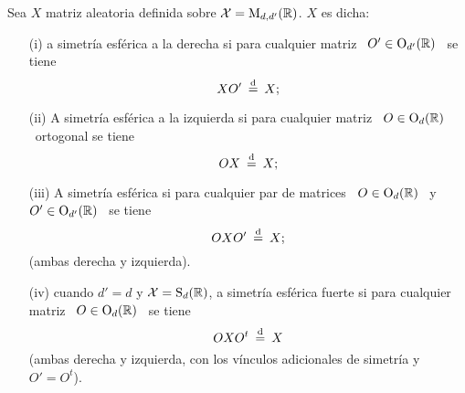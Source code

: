 \begin{definicion}
  Sea  $X$ matriz  aleatoria definida  sobre  $\mathcal{X} =  \mathrm{M}_{d,d'}(\mathbb{R})$.  $X$  es
  dicha:
  \begin{enumerate}%
  \item[(i)] a simetr\'ia esf\'erica a la  derecha si para cualquier matriz \ $O'
    \in \mathrm{O}_{d'}(\mathbb{R})$ \ se tiene
    \[
    X O' \: \stackrel{\mathrm{d}}{=} \: X;
    \]
  \item[(ii)] A simetr\'ia esf\'erica a  la izquierda si para cualquier matriz \
    $O \in \mathrm{O}_d(\mathbb{R})$ \ ortogonal se tiene
    \[
    O X \: \stackrel{\mathrm{d}}{=} \: X;
    \]
  \item[(iii)] A  simetr\'ia esf\'erica si para  cualquier par de  matrices \ $O
    \in \mathrm{O}_d(\mathbb{R})$ \ y \ $O' \in \mathrm{O}_{d'}(\mathbb{R})$ \ se tiene
    \[
    O X O' \: \stackrel{\mathrm{d}}{=} \: X;
    \]
    (ambas derecha y izquierda).
  \item[(iv)]  cuando $d'  = d$  y $\mathcal{X}  = \mathrm{S}_d(\mathbb{R})$,  a  simetr\'ia esf\'erica
    fuerte si para cualquier matriz \ $O \in \mathrm{O}_d(\mathbb{R})$ \ se tiene
    \[
    O X O^t \: \stackrel{\mathrm{d}}{=} \: X
    \]
    (ambas derecha y  izquierda, con los v\'inculos adicionales  de simetr\'ia y
    $O'=O^t$).
\end{enumerate}
\end{definicion}
%

